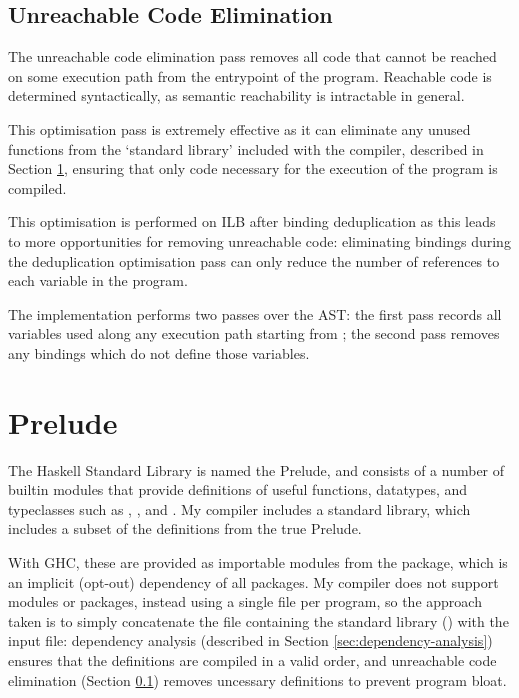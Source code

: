 \documentclass[dissertation.tex]{subfiles}
\begin{document}
{    \subsection{Unreachable Code Elimination}\label{sec:unreachable-elim}
    {
        The unreachable code elimination pass removes all code that cannot be reached on some execution path from the entrypoint of the program. Reachable code is determined syntactically, as semantic reachability is intractable in general.

        This optimisation pass is extremely effective as it can eliminate any unused functions from the `standard library' included with the compiler, described in Section \ref{sec:prelude}, ensuring that only code necessary for the execution of the program is compiled.

        This optimisation is performed on ILB after binding deduplication as this leads to more opportunities for removing unreachable code: eliminating bindings during the deduplication optimisation pass can only reduce the number of references to each variable in the program.

        The implementation performs two passes over the AST: the first pass records all variables used along any execution path starting from ; the second pass removes any bindings which do not define those variables.
    }
}
\section{Prelude}\label{sec:prelude}
{
    The Haskell Standard Library is named the Prelude, and consists of a number of builtin modules that provide definitions of useful functions, datatypes, and typeclasses such as , , and . My compiler includes a standard library, which includes a subset of the definitions from the true Prelude.
    
    With GHC, these are provided as importable modules from the  package, which is an implicit (opt-out) dependency of all packages. My compiler does not support modules or packages, instead using a single file per program, so the approach taken is to simply concatenate the file containing the standard library () with the input file: dependency analysis (described in Section \ref{sec:dependency-analysis}) ensures that the definitions are compiled in a valid order, and unreachable code elimination (Section \ref{sec:unreachable-elim}) removes uncessary definitions to prevent program bloat.
}
\end{document}
